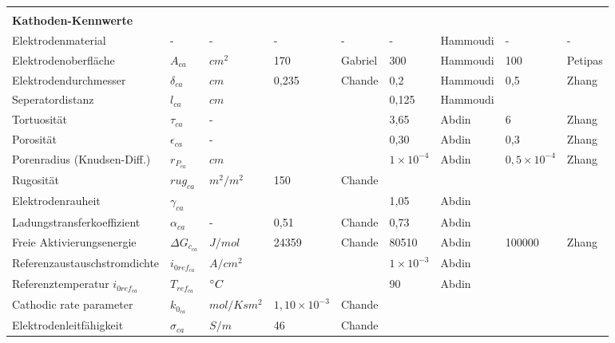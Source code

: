 \documentclass[onecolumn,10pt,titlepage]{article}
\begin{document}
\begin{table}[]
\begin{tabular*}{\textwidth}{lllllllll}
		&&&&&&&& \\
		\textbf{Kathoden-Kennwerte}&&&&&&&& \\
		Elektrodenmaterial 						& - 					& - 				& - 		& - 		& -		 				& Hammoudi 	& - 					& - 		\\
		Elektrodenoberfläche 					& $A_{ca}$ 				& $cm^{2}$ 			& 170 		& Gabriel	& 300 					& Hammoudi 	& 100 					& Petipas	\\
		Elektrodendurchmesser 					& $\delta_{ca}$ 		& $cm$ 				& 0,235		& Chande	& 0,2 					& Hammoudi 	& 0,5 					& Zhang 	\\
		Seperatordistanz 						& $l_{ca}$ 				& $cm$ 				& 	 		& 	 		& 0,125 				& Hammoudi 	& 	 					& 	 		\\

		Tortuosität 							& $\tau_{ca}$	 		& -	 				& 	 		& 			& 3,65 					& Abdin 	& 6 					& Zhang 	\\
		Porosität 								& $\epsilon_{ca}$		& -	 				& 	 		& 			& 0,30 					& Abdin 	& 0,3 					& Zhang 	\\
		Porenradius (Knudsen-Diff.) 			& $r_{P_{ca}}$			& $cm$ 				& 	 		& 	 		& $1\times{10^{-4}}$	& Abdin 	& $0,5\times{10^{-4}}$ 	& Zhang 	\\
		Rugosität 								& $rug_{ca}$			& $m^{2}/m^{2}$		& 150 		& Chande	& 	 					& 		 	& 	 					&	 		\\
		Elektrodenrauheit 						& $\gamma_{ca}$ 		& 	 				& 	 		& 	 		& 1,05 					& Abdin 	& 	 					& 	 		\\

		Ladungstransferkoeffizient 				& $\alpha_{ca}$ 		& - 				& 0,51 		& Chande	& 0,73 					& Abdin 	& 	 					& 	 		\\
		Freie Aktivierungsenergie 				& ${\Delta}G_{c_{ca}}$ 	& $J/mol$		    & 24359		& Chande	& 80510 				& Abdin 	& 100000 				& Zhang 	\\
		Referenzaustauschstromdichte			& $i_{0ref_{ca}}$ 		& $A/cm^{2}$		& 	 		& 	 		& $1\times{10^{-3}}$ 	& Abdin 	& 	 					& 	 		\\
		Referenztemperatur $i_{0ref_{ca}}$ 		& $T_{ref_{ca}}$ 		& $\degree{C}$	 	& 	 		& 	 		& 90 					& Abdin 	& 	 					& 	 		\\
		Cathodic rate parameter					& $k_{0_{ca}}$			& $mol/Ksm^{2}$		& $1,10\times{10^{-3}}$ & Chande 				&&			& 						& 	 		\\
		Elektrodenleitfähigkeit					& $\sigma_{ca}$ 		& $S/m$				& 46	 	& Chande	& 	 					&  			& 	 					& 	 		\\


\end{tabular*}
\end{table}
\end{document}
